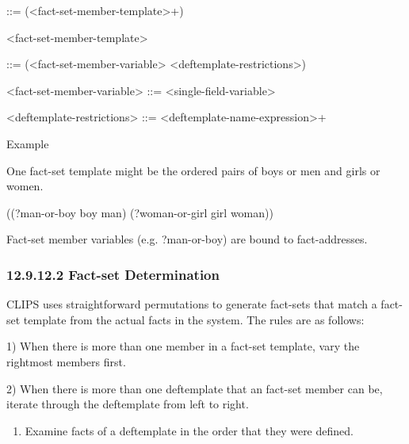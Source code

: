 \documentclass[letterpaper,10pt,english]{sphinxmanual}
\begin{document}

\begin{sphinxVerbatim}[commandchars=\\\{\}]
\end{sphinxVerbatim}

::= (\textless{}fact-set-member-template\textgreater{}+)

\textless{}fact-set-member-template\textgreater{}

::= (\textless{}fact-set-member-variable\textgreater{} \textless{}deftemplate-restrictions\textgreater{})

\textless{}fact-set-member-variable\textgreater{} ::= \textless{}single-field-variable\textgreater{}

\textless{}deftemplate-restrictions\textgreater{} ::= \textless{}deftemplate-name-expression\textgreater{}+

Example

One fact-set template might be the ordered pairs of boys or men and
girls or women.

((?man-or-boy boy man) (?woman-or-girl girl woman))

Fact-set member variables (e.g. ?man-or-boy) are bound to
fact-addresses.


\subsubsection{12.9.12.2 Fact-set Determination}
\label{\detokenize{actions:fact-set-determination}}
CLIPS uses straightforward permutations to generate fact-sets that match
a fact-set template from the actual facts in the system. The rules are
as follows:

1) When there is more than one member in a fact-set template, vary the
rightmost members first.

2) When there is more than one deftemplate that an fact-set member can
be, iterate through the deftemplate from left to right.
\begin{enumerate}
\def\theenumi{\arabic{enumi}}
\def\labelenumi{\theenumi )}
\makeatletter\def\p@enumii{\p@enumi \theenumi )}\makeatother
\setcounter{enumi}{2}
\item {} 
Examine facts of a deftemplate in the order that they were defined.

\end{enumerate}
\end{document}
